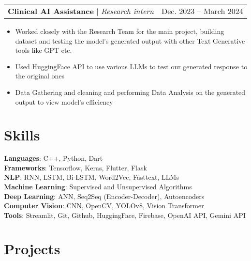 \documentclass[letterpaper,11pt]{article}
\makeatletter
\newcommand{\resumeItem}[1]{
  \item\small{
    {#1 \vspace{-2pt}}
  }
}
\newcommand{\resumeProjectHeading}[2]{
    \item
    \begin{tabular*}{0.97\textwidth}{l@{\extracolsep{\fill}}r}
      \small#1 & #2 \\
    \end{tabular*}\vspace{-7pt}
}
\newcommand{\resumeItemListStart}{\begin{itemize}}
\newcommand{\resumeItemListEnd}{\end{itemize}\vspace{-5pt}}
\makeatother
\begin{document}
          \resumeProjectHeading
          {\textbf{Clinical AI Assistance} $|$ \footnotesize\emph{Research intern}\vspace{8pt}}{Dec. 2023 -- March 2024}
         \resumeItemListStart
            \resumeItem{Worked closely with the Research Team for the main project, building dataset and testing the model's generated output with other Text Generative tools like GPT etc.}
             \resumeItem{Used HuggingFace API to use various LLMs to test our generated response to the original ones}
            \resumeItem{Data Gathering and cleaning and performing Data Analysis on the generated output to view model's efficiency}
          \resumeItemListEnd

          


    
\section{Skills}
 \begin{itemize}[leftmargin=0.15in, label={}]
    \small{\item{
    
     \textbf{Languages}{: C++, Python, Dart} \\
     
     \textbf{Frameworks}{: Tensorflow, Keras, Flutter, Flask} \\
      \textbf{NLP}{: RNN, LSTM, Bi-LSTM, Word2Vec, Fasttext, LLMs}\\
     \textbf{Machine Learning}{: Supervised and Unsupervised Algorithms} \\
      \textbf{Deep Learning}{: ANN, Seq2Seq (Encoder-Decoder), Autoencoders}\\
      \textbf{Computer Vision}{: CNN, OpenCV, YOLOv8, Vision Transformer}\\
        \textbf{Tools}{: Streamlit, Git, Github, HuggingFace, Firebase, OpenAI API, Gemini API}\\
     
     
    }}
 \end{itemize}


\section{Projects}
    
\end{document}
